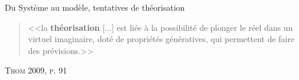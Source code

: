 \documentclass[newPxFont]{beamer}
\begin{document}
\begin{frame}[c]{Du Système au modèle, tentatives de théorisation}
  \vspace{-1em}
  \begin{quote}
    <<la \textbf{théorisation} [...] est liée à la possibilité de plonger le réel dans un virtuel imaginaire, doté de propriétés génératives, qui permettent de faire des prévisions.>>
  \end{quote}
  \hspace*{\fill}\textsc{Thom 2009, p. 91}
  \vspace{-0.5em}
  \begin{figure}
   	\centering
   		\hspace{0.2em} %
      \hspace{0.2em} %
   		\hspace{0.2em} %
  \end{figure}
\end{frame}
\end{document}
